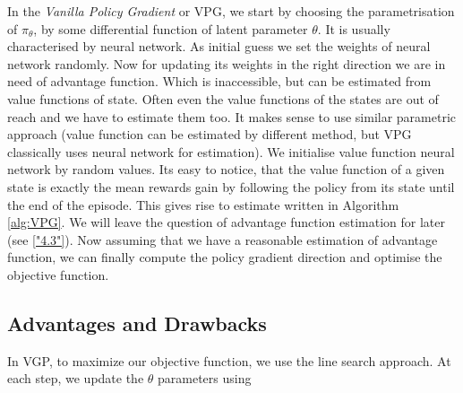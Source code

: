 \documentclass{article}
\begin{document}
In the \textit{Vanilla Policy Gradient} or VPG, we start by choosing the parametrisation of $\pi_{\theta}$, by some differential function of latent parameter $\theta$. It is usually characterised by neural network. As initial guess we set the weights of neural network randomly.  Now for updating its weights in the right direction we are in need of advantage function. Which is inaccessible, but can be estimated from value functions of state. Often even the value functions of the states are out of reach and we have to estimate them too. It makes sense to use similar parametric approach (value function can be estimated by different method, but VPG classically uses neural network for estimation). We initialise value function neural network by random values. Its easy to notice, that the value function of a given state is exactly the mean rewards gain by following the policy from its state until the end of the episode. This gives rise to estimate written in Algorithm \ref{alg:VPG}. We will leave the question of advantage function estimation for later (see \ref{"4.3"}).  Now assuming that we have a reasonable estimation of advantage function, we can finally compute the policy gradient direction and optimise the objective function.


\subsection{Advantages and Drawbacks}
In VGP, to maximize our objective function, we use the line search approach. At each step, we update the $\theta$ parameters using 
\end{document}

